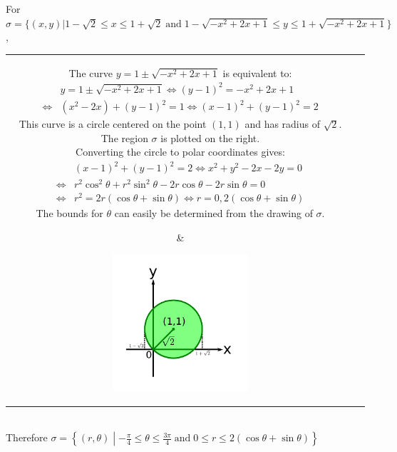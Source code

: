 \documentclass{article}
\newcommand{\dr}[1]{\textcolor{dark_red}{#1}}
\begin{document}
\dr{\begin{framed}
For \(\sigma = \{(x,y) | 1 - \sqrt{2} \leq x \leq 1 + \sqrt{2} \;\text{and}\; 1 - \sqrt{-x^2 + 2x + 1} \leq y \leq 1 + \sqrt{-x^2 + 2x + 1}\}\), \\
\begin{tabular}{cc}
\parbox{0.6\textwidth}{
The curve \(y = 1 \pm \sqrt{-x^2 + 2x + 1}\) is equivalent to: \\
\begin{align*}
& y = 1 \pm \sqrt{-x^2 + 2x + 1} 
\iff (y - 1)^2 = -x^2 + 2x + 1 \\
\iff & (x^2 - 2x) + (y - 1)^2 = 1 
\iff (x - 1)^2 + (y - 1)^2 = 2
\end{align*}
This curve is a circle centered on the point \((1,1)\) and has radius of \(\sqrt{2}\). The region \(\sigma\) is plotted on the right. \\
Converting the circle to polar coordinates gives: 
\begin{align*}
& (x - 1)^2 + (y - 1)^2 = 2 
\iff x^2 + y^2 - 2x - 2y = 0 \\
\iff & r^2\cos^2\theta + r^2\sin^2\theta - 2r\cos\theta - 2r\sin\theta = 0 \\
\iff & r^2 = 2r(\cos\theta + \sin\theta) 
\iff r = 0, 2(\cos\theta + \sin\theta) 
\end{align*}
The bounds for \(\theta\) can easily be determined from the drawing of \(\sigma\).
} & \parbox{0.4\textwidth}{
\includegraphics[width = 0.4\textwidth]{Test_bench_part_3x_images/Test_bench_part_3x_Solutions_image_7}
}
\end{tabular} \\
Therefore \(\sigma = \left\{(r,\theta) \middle| -\frac{\pi}{4} \leq \theta \leq \frac{3\pi}{4} \;\text{and}\; 0 \leq r \leq 2(\cos\theta + \sin\theta)\right\}\)
\end{framed}}
\end{document}
